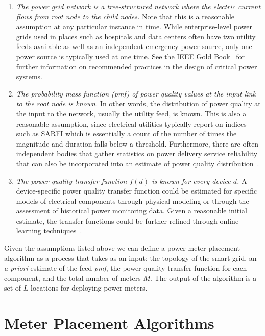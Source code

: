 \begin{enumerate}
\item \emph{The power grid network is a tree-structured network where the electric current flows from root node to the child nodes.}
Note that this is a 
reasonable assumption at any particular instance in time. While enterprise-level power grids used in places such as hospitals and data centers often have two utility feeds available as well as an independent emergency power source, only one power source is typically used at one time. See the IEEE Gold Book~\cite{goldbook} for further information on recommended practices in the design of critical power systems. 

\item \emph{The probability mass function (pmf) of power quality values at the input link to the root node is known.} In other words, the distribution of power quality at the input to the network, usually the utility feed, is known.
This is also a reasonable assumption, since electrical utilities typically report on indices such as SARFI which is essentially a count of the number of times the magnitude and duration falls below a threshold.  
Furthermore, there are often independent bodies that gather statistics on power delivery service reliability that can also be incorporated into an estimate of power quality distribution~\cite{chowdhury2004reliability}. 

\item \emph{The power quality transfer function $f(d)$ is known for every device $d$.}  
A device-specific power quality transfer function could be estimated for specific models of electrical components 
through physical modeling or through the assessment of historical power monitoring data. 
Given a reasonable initial estimate, 
the transfer functions could be further refined through online learning techniques~\cite{catherine_pri}. 
\end{enumerate}

Given the assumptions listed above we can define a power meter placement algorithm as a process that takes as 
an input: the topology of the smart grid, an \textit{a priori} estimate of the feed \emph{pmf}, the power quality transfer function for each component, and the total number of meters $M$. The output of the algorithm is a set of $L$ locations for deploying power meters. 

\section{Meter Placement Algorithms}
